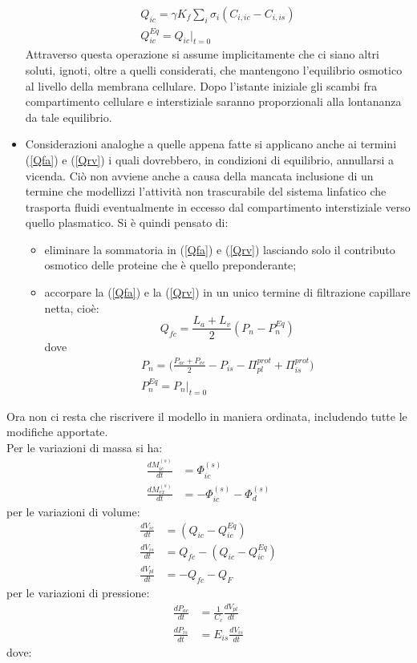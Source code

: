 \begin{itemize}
\begin{gather*}
	  	Q_{ic}   = \gamma K_f \sum_i{\sigma_i(C_{i,ic}-C_{i,is})}\\
	  	Q_{ic}^{Eq} = Q_{ic} \lvert_{t=0}
	  \end{gather*}
	  Attraverso questa operazione si assume implicitamente che ci siano altri soluti, ignoti, oltre a quelli considerati, che mantengono l'equilibrio
	  osmotico al livello della membrana cellulare. Dopo l'istante iniziale gli scambi fra compartimento cellulare e interstiziale saranno proporzionali      alla lontananza da tale equilibrio.
	  \item Considerazioni analoghe a quelle appena fatte si applicano anche ai termini (\ref{Qfa}) e (\ref{Qrv}) i quali dovrebbero, in condizioni di
	  equilibrio, annullarsi a vicenda. Ciò non avviene anche a causa della mancata inclusione di un termine che modellizzi l'attività non trascurabile
	  del sistema linfatico che trasporta fluidi eventualmente in eccesso dal compartimento interstiziale verso quello plasmatico. Si è quindi pensato di:
	  \begin{itemize}
	  	\item eliminare la sommatoria in (\ref{Qfa}) e (\ref{Qrv}) lasciando solo il contributo osmotico delle proteine che è quello preponderante;
	  	\item accorpare la (\ref{Qfa}) e la (\ref{Qrv}) in un unico termine di filtrazione capillare netta, cioè:
	  	$$
	  		Q_{fc}=\frac{L_a+L_v}{2}(P_n - P_n^{Eq})
	  	$$
	  	dove
	  	\begin{gather}
	  		P_n=\biggl(\frac{P_{ac}+P_{vc}}{2} - P_{is} - \Pi_{pl}^{prot} + \Pi_{is}^{prot}\biggr)\\
	  		P_n^{Eq}= P_n\lvert_{t=0}
	  	\end{gather}
	  \end{itemize}
\end{itemize}
\noindent
Ora non ci resta che riscrivere il modello in maniera ordinata, includendo tutte le modifiche apportate.\\
\newline
Per le variazioni di massa si ha:
\begin{align*}
		\frac{dM_{ic}^{(s)}}{dt} &= \Phi_{ic}^{(s)}                \\
		\frac{dM_{ex}^{(s)}}{dt} &= -\Phi_{ic}^{(s)} -\Phi_d^{(s)} 
\end{align*}
\newline
per le variazioni di volume:
\begin{align*}
		\frac{dV_{ic}}{dt} &= (Q_{ic}-Q_{ic}^{Eq})\\
		\frac{dV_{is}}{dt} &= Q_{fc} -(Q_{ic}-Q_{ic}^{Eq})\\
		\frac{dV_{pl}}{dt} &= -Q_{fc} -Q_{F}
\end{align*}
\newline
per le variazioni di pressione:
\begin{align*}
		\frac{dP_{ac}}{dt} &= \frac{1}{C_c} \frac{dV_{pl}}{dt}\\
		\frac{dP_{is}}{dt} &= E_{is}\frac{dV_{is}}{dt}
\end{align*}
\newline
dove:

